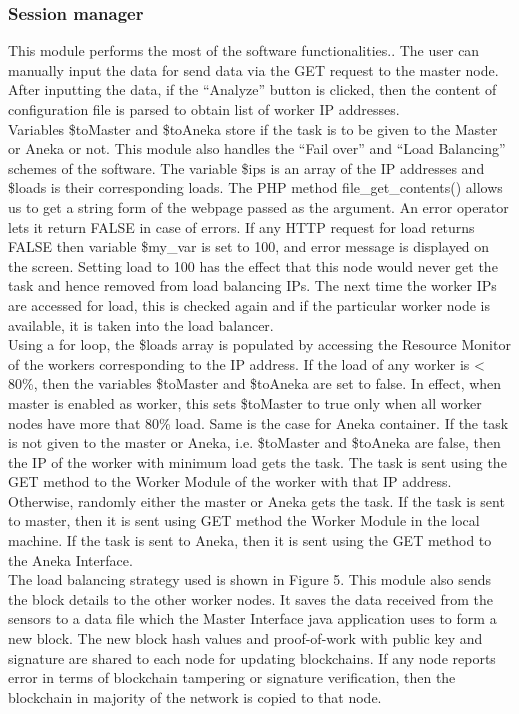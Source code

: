 \documentclass[10pt,journal,compsoc]{IEEEtran}
\begin{document}
\subsubsection{Session manager}
This module performs the most of the software functionalities.. The user can manually input the data for send data via the GET request to the master node. After inputting the data, if the “Analyze” button is clicked, then the content of configuration file is parsed to obtain list of worker IP addresses. \\
Variables \$toMaster and \$toAneka store if the task is to be given to the Master or Aneka or not. This module also handles the “Fail over” and “Load Balancing” schemes of the software. The variable \$ips is an array of the IP addresses and \$loads is their corresponding loads. The PHP method file\_get\_contents() allows us to get a string form of the webpage passed as the argument. An error operator lets it return FALSE in case of errors. If any HTTP request for load returns FALSE then variable \$my\_var is set to 100, and error message is displayed on the screen. Setting load to 100 has the effect that this node would never get the task and hence removed from load balancing IPs. The next time the worker IPs are accessed for load, this is checked again and if the particular worker node is available, it is taken into the load balancer. \\
Using a for loop, the \$loads array is populated by accessing the Resource Monitor of the workers corresponding to the IP address. If the load of any worker is < 80\%, then the variables \$toMaster and \$toAneka are set to false. In effect, when master is enabled as worker, this sets \$toMaster to true only when all worker nodes have more that 80\% load. Same is the case for Aneka container. If the task is not given to the master or Aneka, i.e. \$toMaster and \$toAneka are false, then the IP of the worker with minimum load gets the task. The task is sent using the GET method to the Worker Module of the worker with that IP address. Otherwise, randomly either the master or Aneka gets the task. If the task is sent to master, then it is sent using GET method the Worker Module in the local machine. If the task is sent to Aneka, then it is sent using the GET method to the Aneka Interface. \\
The load balancing strategy used is shown in Figure 5.
This module also sends the block details to the other worker nodes. It saves the data received from the sensors to a data file which the Master Interface java application uses to form a new block. The new block hash values and proof-of-work with public key and signature are shared to each node for updating blockchains. If any node reports error in terms of blockchain tampering or signature verification, then the blockchain in majority of the network is copied to that node.
\end{document}

